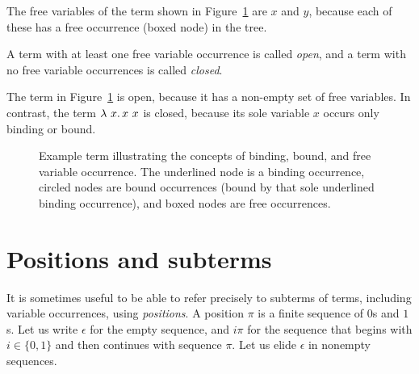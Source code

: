 \noindent The free variables of the term shown in Figure~\ref{fig:varocc} are $x$ and $y$, because each of these has a free occurrence (boxed node) in the tree.

\begin{definition}
A term with at least one free variable occurrence is called \emph{open},
and a term with no free variable occurrences is called \emph{closed}.
\end{definition}

\noindent The term in Figure~\ref{fig:varocc} is open, because it has a non-empty set of free variables.  In contrast, the term $\lambda\ x.\, x\ x$ is closed, because its sole variable $x$ occurs only binding or bound.

\begin{figure}
\large
\begin{center}
    \end{center}
    \caption{Example term illustrating the concepts of binding, bound, and free variable occurrence.  The underlined node is a binding occurrence, circled nodes are bound occurrences (bound by that sole underlined binding occurrence), and boxed nodes are free occurrences.}
    \label{fig:varocc}

\end{figure}

\section{Positions and subterms}
\label{sec:pos}

It is sometimes useful to be able to refer precisely to subterms of
terms, including variable occurrences, using \emph{positions}.  A
position $\pi$ is a finite sequence of $0$s and $1$s. Let us write
$\epsilon$ for the empty sequence, and $i\pi$ for the sequence that
begins with $i\in\{0,1\}$ and then continues with sequence $\pi$. Let
us elide $\epsilon$ in nonempty sequences. 

